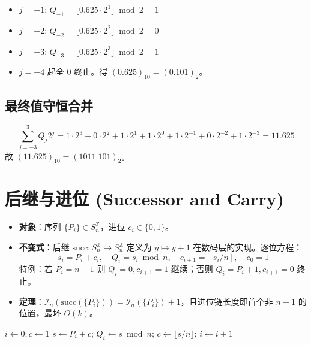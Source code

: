 \begin{itemize}
    \item $j=-1$: $Q_{-1} = \lfloor 0.625 \cdot 2^{1} \rfloor \bmod 2 = 1$
    \item $j=-2$: $Q_{-2} = \lfloor 0.625 \cdot 2^{2} \rfloor \bmod 2 = 0$
    \item $j=-3$: $Q_{-3} = \lfloor 0.625 \cdot 2^{3} \rfloor \bmod 2 = 1$
    \item $j=-4$ 起全 $0$ 终止。得 $(0.625)_{10} = (0.101)_2$。
\end{itemize}

\subsection{最终值守恒合并}

$$\sum_{j=-3}^{3} Q_j 2^j = 1\cdot2^3 + 0\cdot2^2 + 1\cdot2^1 + 1\cdot2^0 + 1\cdot2^{-1} + 0\cdot2^{-2} + 1\cdot2^{-3} = 11.625$$
故 $(11.625)_{10} = (1011.101)_2$。

\section{后继与进位 (Successor and Carry)}

\begin{itemize}
    \item \textbf{对象}：序列 $\{P_i\} \in S_n^{\mathbb{Z}}$，进位 $c_i \in \{0,1\}$。
    \item \textbf{不变式}：后继 $\text{succ}: S_n^{\mathbb{Z}} \to S_n^{\mathbb{Z}}$ 定义为 $y \mapsto y+1$ 在数码层的实现。逐位方程：
$$s_i = P_i + c_i, \quad Q_i = s_i \bmod n, \quad c_{i+1} = \left\lfloor s_i / n \right\rfloor, \quad c_0 = 1$$
特例：若 $P_i = n-1$ 则 $Q_i = 0, c_{i+1}=1$ 继续；否则 $Q_i = P_i+1, c_{i+1}=0$ 终止。
    \item \textbf{定理}：$\mathcal{I}_n(\text{succ}(\{P_i\})) = \mathcal{I}_n(\{P_i\}) + 1$，且进位链长度即首个非 $n-1$ 的位置，最坏 $O(k)$。
\end{itemize}

\begin{algorithm}[H]
\caption{后继（进位链）}
\begin{algorithmic}[1]
\State $i \gets 0; c \gets 1$
    \State $s \gets P_i + c$; $Q_i \gets s \bmod n$; $c \gets \lfloor s/n \rfloor$; $i \gets i+1$
\EndWhile
\end{algorithmic}
\end{algorithm}

